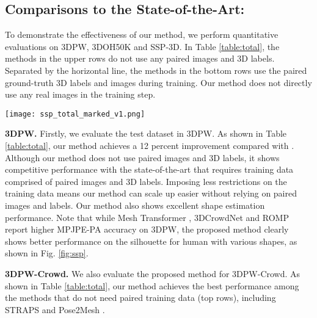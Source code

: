 \documentclass[journal]{IEEEtran}
\begin{document}
\subsection{Comparisons to the State-of-the-Art:}

To demonstrate the effectiveness of our method, we perform quantitative evaluations on 3DPW, 3DOH50K and SSP-3D. In Table \ref{table:total}, the methods in the upper rows do not use any paired images and 3D labels. Separated by the horizontal line, the methods in the bottom rows use the paired ground-truth 3D labels and images during training. Our method does not directly use any real images in the training step.

\begin{figure*}[htbp]
    
    \centerline{\texttt{[image: ssp\_total\_marked\_v1.png]}}
\caption{\textbf{Qualitative comparison for different body shapes with the state-of-the-art methods 3DCrowdNet \cite{choi20213dcrowdnet}, Mesh Transformer \cite{lin2021end-to-end}, ROMP \cite{ROMP} and STRAPS \cite{STRAPS2020BMVC}.} The samples are from the SSP-3D dataset. The results of ROMP \cite{ROMP}, STRAPS \cite{STRAPS2020BMVC}, and Mesh Transformer \cite{lin2021end-to-end} are generated from their corresponding official codes, and the results of 3DCrowdNet \cite{choi20213dcrowdnet} are provided by  the author. Our method is able to accurately predict a diverse range of body shapes.}
    \label{fig:ssp}
\end{figure*}

\noindent\textbf{3DPW.} Firstly, we evaluate the test dataset in 3DPW. As shown in Table \ref{table:total}, our method achieves a 12 percent improvement compared with \cite{STRAPS2020BMVC}. Although our method does not use paired images and 3D labels, it shows competitive performance with the state-of-the-art that requires training data comprised of paired images and 3D labels. Imposing less restrictions on the training data means our method can scale up easier without relying on paired images and labels. Our method also shows excellent shape estimation performance.  Note that while Mesh Transformer \cite{lin2021end-to-end}, 3DCrowdNet \cite{choi20213dcrowdnet} and ROMP \cite{ROMP} report higher MPJPE-PA accuracy on 3DPW, the proposed method clearly shows better performance on the silhouette for human with various shapes, as shown in Fig. \ref{fig:ssp}.


\noindent\textbf{3DPW-Crowd.} We also evaluate the proposed method for 3DPW-Crowd. As shown in Table \ref{table:total}, our method achieves the best performance among the methods that do not need paired training data (top rows), including STRAPS \cite{STRAPS2020BMVC} and Pose2Mesh \cite{Choi_2020_ECCV_Pose2Mesh}. 
\end{document}
